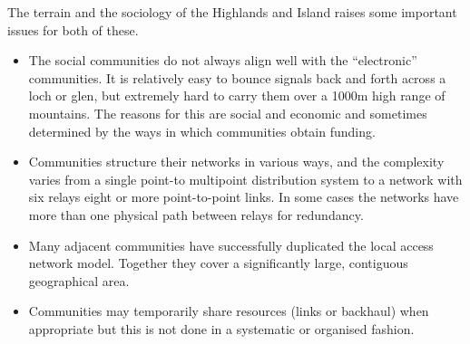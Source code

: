 The terrain and the sociology of the Highlands and Island raises some
important issues for both of these.
\begin{itemize}
\item The social communities do not always align well with the
  ``electronic'' communities. It is relatively easy to bounce signals
  back and forth across a loch or glen, but extremely hard to carry
  them over a 1000m high range of mountains. The reasons for this are
  social and economic and sometimes determined by the ways in which
  communities obtain funding.%
\item Communities structure their networks in various ways, and the
  complexity varies from a single point-to multipoint distribution
  system to a network with six relays  eight or more point-to-point
  links.  In some cases the networks have more than one physical path
  between relays for redundancy.
\item Many adjacent communities have successfully duplicated the local
  access network model. Together they cover a significantly large,
  contiguous geographical area.
\item Communities may temporarily share resources (links or backhaul)
  when appropriate but this is not done in a systematic or organised
  fashion.
\end{itemize}

